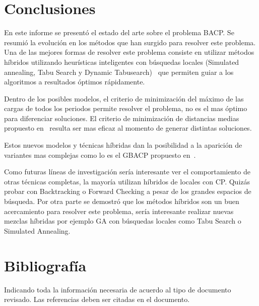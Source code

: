 \documentclass[letterpaper,10pt]{article}
\begin{document}
\section{Conclusiones}

En este informe se presentó el estado del arte sobre el problema BACP. Se resumió la evolución en los métodos que han surgido para resolver este problema. Una de las mejores formas de resolver este problema consiste en utilizar métodos híbridos utilizando heurísticas inteligentes con búsquedas locales (Simulated annealing, Tabu Search y Dynamic Tabusearch)~\cite{GbacpGaspero} que permiten guiar a los algoritmos a resultados óptimos rápidamente.

Dentro de los posibles modelos, el criterio de minimización del máximo de las cargas de todos los periodos permite resolver el problema, no es el mas óptimo para diferenciar soluciones. El criterio de minimización de distancias medias propuesto en~\cite{Monette07acp} resulta ser mas eficaz al momento de generar distintas soluciones.

Estos nuevos modelos y técnicas híbridas dan la posibilidad a la aparición de variantes mas complejas como lo es el GBACP propuesto en~\cite{GbacpGaspero,balac}.

Como futuras líneas de investigación sería interesante ver el comportamiento de otras técnicas completas, la mayoría utilizan híbridos de locales con CP. Quizás probar con Backtracking  o Forward Checking a pesar de los grandes espacios de búsqueda. Por otra parte se demostró que los métodos híbridos son un buen acercamiento para resolver este problema, sería interesante realizar nuevas mezclas híbridas por ejemplo GA con búsquedas locales como Tabu Search o Simulated Annealing.

\section{Bibliografía}

Indicando toda la información necesaria de acuerdo al tipo de documento
revisado. Las referencias deben ser citadas en el documento.  

\end{document}
